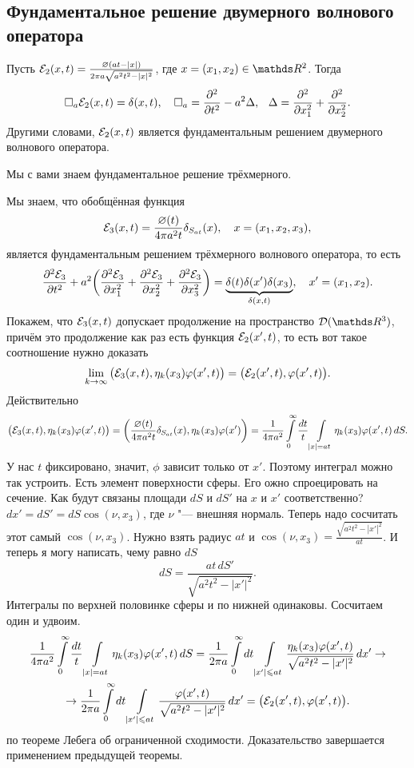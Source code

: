 \subsection{Фундаментальное решение двумерного волнового оператора}
\begin{The}
	Пусть $\mathcal E_2(x,t) = \frac{\varnothing(at - |x|)}{2\pi a\sqrt{a^2 t^2 - |x|^2}}$, где $x = (x_1,x_2)\in\R^2$. Тогда
	\[
		\square_a\mathcal E_2(x,t) = \delta(x,t),\quad \square_a = \frac{\partial ^2}{\partial t^2} - a^2\Delta,\hskip .75em plus.1em minus.08em\relax \Delta = \frac{\partial ^2}{\partial x_1^2}+\frac{\partial ^2}{\partial x_2^2}.
	\]
	Другими словами, $\mathcal E_2(x,t)$ является фундаментальным решением двумерного волнового оператора.
\end{The}
Мы с вами знаем фундаментальное решение трёхмерного.
\begin{Proof}
	Мы знаем, что обобщённая функция
	\[
		\mathcal E_3(x,t) = \frac{\varnothing(t)}{4\pi a^2 t}\delta_{S_{at}}(x),\quad x = (x_1,x_2,x_3),
	\]
	является фундаментальным решением трёхмерного волнового оператора, то есть
	\[
		\frac{\partial ^2\mathcal E_3}{\partial t^2} + a^2\bigg(\frac{\partial ^2\mathcal E_3}{\partial x_1^2} + \frac{\partial ^2\mathcal E_3}{\partial x_2^2} + \frac{\partial ^2\mathcal E_3}{\partial x_3^2}\bigg) = \underbrace{\delta(t)\delta(x')\delta(x_3)}_{\delta(x,t)},\quad x' = (x_1,x_2).
	\]
	Покажем, что $\mathcal E_3(x,t)$ допускает продолжение на пространство $\D(\R^3)$, причём это продолжение как раз есть функция $\mathcal E_2(x',t)$, то есть вот такое соотношение нужно доказать
	\[
		\lim\limits_{k\rightarrow\infty}\big(\mathcal E_3(x,t),\eta_k(x_3)\varphi(x',t)\big) = \big(\mathcal E_2(x',t),\varphi(x',t)\big).
	\]
	Действительно
	\[
		\big(\mathcal E_3(x,t),\eta_k(x_3)\varphi(x',t)\big) = \bigg(\frac{\varnothing(t)}{4\pi a^2 t}\delta_{S_{at}}(x),\eta_k(x_3)\varphi(x')\bigg) =
		\frac1{4\pi a^2}\int\limits_0^\infty\frac{dt}t\int\limits_{|x|=at}\eta_k(x_3)\varphi(x',t)  \,dS.
	\]
	У нас $t$ фиксировано, значит, $\phi$ зависит только от $x'$. Поэтому интеграл можно так устроить. Есть элемент поверхности сферы. Его ожно спроецировать на сечение. Как будут связаны площади $dS$ и $dS'$ на $x$ и $x'$ соответственно? $dx'=dS' = dS\cos(\nu,x_3)$, где $\nu$ "--- внешняя нормаль. Теперь надо сосчитать этот самый $\cos(\nu,x_3)$. Нужно взять радиус $at$ и $\cos(\nu,x_3) = \frac{\sqrt{a^2 t^2 - |x'|^2}}{at}$. И теперь я могу написать, чему равно $dS$
	\[
		dS = \frac{at\, dS'}{\sqrt{a^2t^2-|x'|^2}}.
	\]
	Интегралы по верхней половинке сферы и по нижней одинаковы. Сосчитаем один и удвоим.
	\begin{multline*}
		\frac1{4\pi a^2}\int\limits_0^\infty\frac{dt}t\int\limits_{|x|=at}\eta_k(x_3)\varphi(x',t)  \,dS = 
		\frac1{2\pi a}\int\limits_0^\infty dt\int\limits_{|x'|\leqslant at}\frac{\eta_k(x_3)  \varphi(x',t)}{\sqrt{a^2t^2 - |x'|^2}}\,dx'\rightarrow\\
		\rightarrow\frac1{2\pi a}\int\limits_0^\infty dt\int\limits_{|x'|\leqslant at}\frac{\varphi(x',t)}{\sqrt{a^2t^2 - |x'|^2}}\,dx' = 
		\big(\mathcal E_2(x',t),\varphi(x',t)\big).
	\end{multline*}
	по теореме Лебега об ограниченной сходимости. Доказательство завершается применением предыдущей теоремы.
\end{Proof}
